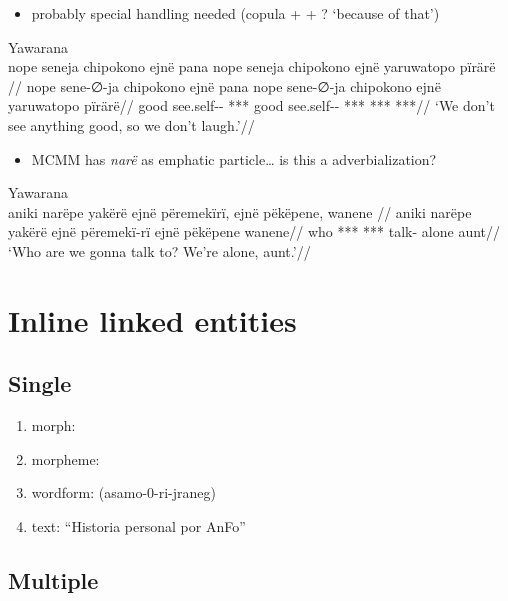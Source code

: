 \documentclass{memoir}
\begin{document}
\begin{itemize}
\tightlist
\item
  probably special handling needed (copula +  + ? `because of
  that')
\end{itemize}

\ex Yawarana \\
\label{convrisamaj-29}    \begingl
    \glpreamble  nope seneja chipokono ejnë pana nope seneja chipokono ejnë yaruwatopo pïrärë //
    \gla nope sene-∅-ja chipokono ejnë pana nope sene-∅-ja chipokono ejnë yaruwatopo pïrärë//
    \glb good see.self-- ***   good see.self-- ***  *** ***//
        \glft ‘We don’t see anything good, so we don’t laugh.’//  
    \endgl 
\xe

\begin{itemize}
\tightlist
\item
  MCMM has \emph{narë} as emphatic particle\ldots{} is this a
  adverbialization?
\end{itemize}

\ex Yawarana \\
\label{convrisamaj-47}    \begingl
    \glpreamble  aniki narëpe yakërë ejnë përemekïrï, ejnë pëkëpene, wanene //
    \gla aniki narëpe yakërë ejnë përemekï-rï ejnë pëkëpene wanene//
    \glb who *** ***  talk-  alone aunt//
        \glft ‘Who are we gonna talk to? We’re alone, aunt.’//  
    \endgl 
\xe

\section{Inline linked entities}

\subsection{Single}

\begin{enumerate}
\def\labelenumi{\arabic{enumi}.}
\tightlist
\item
  morph: 
\item
  morpheme: 
\item
  wordform: (asamo-0-ri-jraneg)
\item
  text: ``Historia personal por AnFo''
\end{enumerate}

\subsection{Multiple}
\end{document}
